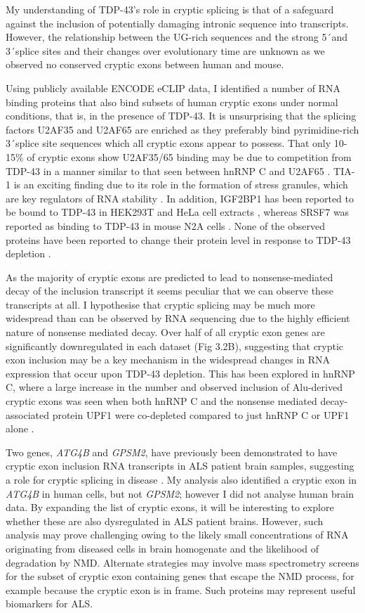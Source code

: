 My understanding of TDP-43's role in cryptic splicing is that of a safeguard against the inclusion of potentially damaging intronic sequence into transcripts. However, the relationship between the UG-rich sequences and the strong 5\'\ and 3\'\ splice sites and their changes over evolutionary time are unknown as we observed no conserved cryptic exons between human and mouse. 

Using publicly available ENCODE eCLIP data, I identified a number of RNA binding proteins that also bind subsets of human cryptic exons under normal conditions, that is, in the presence of TDP-43.  It is unsurprising that the splicing factors U2AF35 and U2AF65 are enriched as they preferably bind pyrimidine-rich 3\'\ splice site sequences which all cryptic exons appear to possess. That only 10-15\% of cryptic exons show U2AF35/65 binding may be due to competition from TDP-43 in a manner similar to that seen between hnRNP C and U2AF65 \citep{Zarnack2013-nv}. TIA-1 is an exciting finding due to its role in the formation of stress granules, which are key regulators of RNA stability \citep{gilks2004stress}. In addition, IGF2BP1 has been reported to be bound to TDP-43 in HEK293T and HeLa cell extracts \citep{Ling2010-sr,Freibaum2010-hw}, whereas SRSF7 was reported as binding to TDP-43 in mouse N2A cells \citep{Blokhuis2016-hw}. None of the observed proteins have been reported to change their protein level in response to TDP-43 depletion \citep{Stalekar2015-qd}.

As the majority of cryptic exons are predicted to lead to nonsense-mediated decay of the inclusion transcript it seems peculiar that we can observe these transcripts at all. I hypothesise that cryptic splicing may be much more widespread than can be observed by RNA sequencing due to the highly efficient nature of nonsense mediated decay. Over half of all cryptic exon genes are significantly downregulated in each dataset (Fig 3.2B), suggesting that cryptic exon inclusion may be a key mechanism in the widespread changes in RNA expression that occur upon TDP-43 depletion. This has been explored in hnRNP C, where a large increase in the number and observed inclusion of Alu-derived cryptic exons was seen when both hnRNP C and the nonsense mediated decay-associated protein UPF1 were co-depleted compared to just hnRNP C or UPF1 alone \citep{Attig2016}.

Two genes, \emph{ATG4B} and \emph{GPSM2}, have previously been demonstrated to have cryptic exon inclusion RNA transcripts in ALS patient brain samples, suggesting a role for cryptic splicing in disease \citep{Ling2015}. My analysis also identified a cryptic exon in \emph{ATG4B} in human cells, but not \emph{GPSM2}; however I did not analyse human brain data. By expanding the list of cryptic exons, it will be interesting to explore whether these are also dysregulated in ALS patient brains. However, such analysis may prove challenging owing to the likely small concentrations of RNA originating from diseased cells in brain homogenate and the likelihood of degradation by NMD. Alternate strategies may involve mass spectrometry screens for the subset of cryptic exon containing genes that escape the NMD process, for example because the cryptic exon is in frame. Such proteins may represent useful biomarkers for ALS. 

